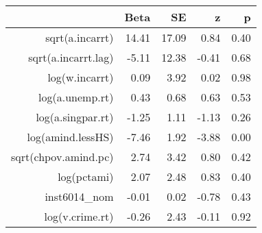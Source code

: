 \begin{table}[ht]
\centering
\begin{tabular}{rrrrr}
  \hline
 & Beta & SE & z & p \\ 
  \hline
sqrt(a.incarrt) & 14.41 & 17.09 & 0.84 & 0.40 \\ 
  sqrt(a.incarrt.lag) & -5.11 & 12.38 & -0.41 & 0.68 \\ 
  log(w.incarrt) & 0.09 & 3.92 & 0.02 & 0.98 \\ 
  log(a.unemp.rt) & 0.43 & 0.68 & 0.63 & 0.53 \\ 
  log(a.singpar.rt) & -1.25 & 1.11 & -1.13 & 0.26 \\ 
  log(amind.lessHS) & -7.46 & 1.92 & -3.88 & 0.00 \\ 
  sqrt(chpov.amind.pc) & 2.74 & 3.42 & 0.80 & 0.42 \\ 
  log(pctami) & 2.07 & 2.48 & 0.83 & 0.40 \\ 
  inst6014\_nom & -0.01 & 0.02 & -0.78 & 0.43 \\ 
  log(v.crime.rt) & -0.26 & 2.43 & -0.11 & 0.92 \\ 
   \hline
\end{tabular}
\end{table}
